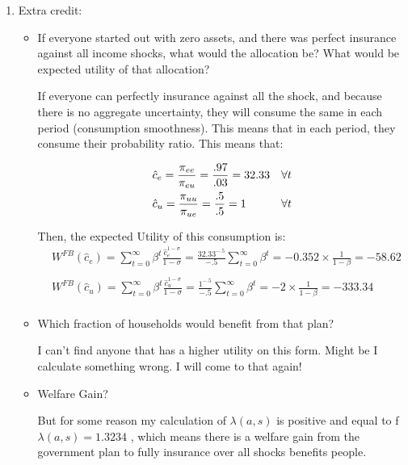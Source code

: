 \documentclass[12pt]{article}%
\begin{document}
\begin{enumerate}
	\item Extra credit:
	
	\begin{itemize}
		\item If everyone started out with zero assets, and there was perfect insurance against all income shocks, what would the allocation be? What would be expected utility of that allocation?
		
		\vspace{1mm}
		
		If everyone can perfectly insurance against all the shock, and because there is no aggregate uncertainty, they will consume the same in each period (consumption smoothness). This means that in each period, they consume their probability ratio. This means that:
		
			\begin{align*}
		&\hat{c}_e=\frac{\pi_{ee}}{\pi_{eu}}=\frac{.97}{.03}=32.33  & \forall t \notag \\ 	
		&\hat{c}_u=\frac{\pi_{uu}}{\pi_{ue}}=\frac{.5}{.5}=1   & \forall t \notag \\ 			
		\end{align*}
		
		Then, the expected Utility of this consumption is: 
				\begin{align*}
		&W^{FB}(\hat{c}_e)={\sum}_{t=0}^{\infty}\beta^{t}\frac{\hat{c}_e^{1-\sigma}}{1-\sigma}=\frac{32.33^{-.5}}{-.5}{\sum}_{t=0}^{\infty}\beta^{t}=-0.352\times\frac{1}{1-\beta}=-58.62\\
		\\
		&W^{FB}(\hat{c}_u)={\sum}_{t=0}^{\infty}\beta^{t}\frac{\hat{c}_u^{1-\sigma}}{1-\sigma}=\frac{1^{-.5}}{-.5}{\sum}_{t=0}^{\infty}\beta^{t}=-2\times\frac{1}{1-\beta}=-333.34\\		 
		\end{align*}
		
		\vspace{1mm}
		
		\item Which fraction of households would benefit from that plan?
			
		\vspace{1mm}
		
		I can't find anyone that has a higher utility on this form. Might be I calculate something wrong. I will come to that again!
		
		
		\item Welfare Gain?
			\vspace{1mm}
		
		But for some reason my calculation of $\lambda(a,s)$ is positive and equal to f $\lambda(a,s)=1.3234$ , which means there is a welfare gain from the government plan to fully insurance over all shocks benefits people. 
		
		
	\end{itemize}
	
\end{enumerate}

\strut

\onehalfspacing
\end{document}
